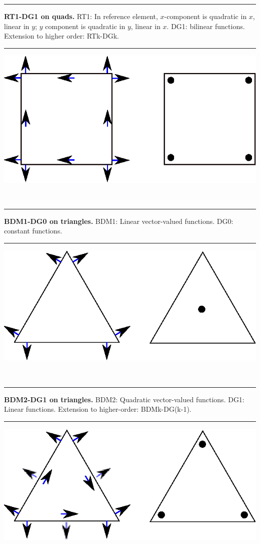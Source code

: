 \documentclass[landscape]{imposter}
\begin{document}
\begin{multicols*}{3}
\parbox{25cm}{\hrule height 0pt width 0pt {\bfseries RT1-DG1 on quads.}
RT1: In reference element, $x$-component is quadratic in $x$, linear in
$y$; $y$ component is quadratic in $y$, linear in
$x$. DG1: bilinear functions. Extension to higher order: RTk-DGk.}
\hspace{1cm}
\parbox{25cm}{\hrule height 0pt width 0pt \includegraphics{RT1Q1DOFS}}
\vspace{1cm} \\
\parbox{25cm}{\hrule height 0pt width 0pt {\bfseries BDM1-DG0 on triangles.}
  BDM1: Linear vector-valued functions. DG0: constant functions.}
\hspace{1cm}
\parbox{25cm}{\hrule height 0pt width 0pt 
\includegraphics{BDM1_DOFS}} \vspace{1cm} \\
\parbox{25cm}{\hrule height 0pt width 0pt {\bfseries BDM2-DG1 on triangles.}
BDM2: Quadratic vector-valued functions. DG1: Linear functions. Extension
to higher-order: BDMk-DG(k-1).}
\hspace{1cm}
\parbox{25cm}{\hrule height 0pt width 0pt \includegraphics{BDM2_DOFS}}

\end{multicols*}
\end{document}
